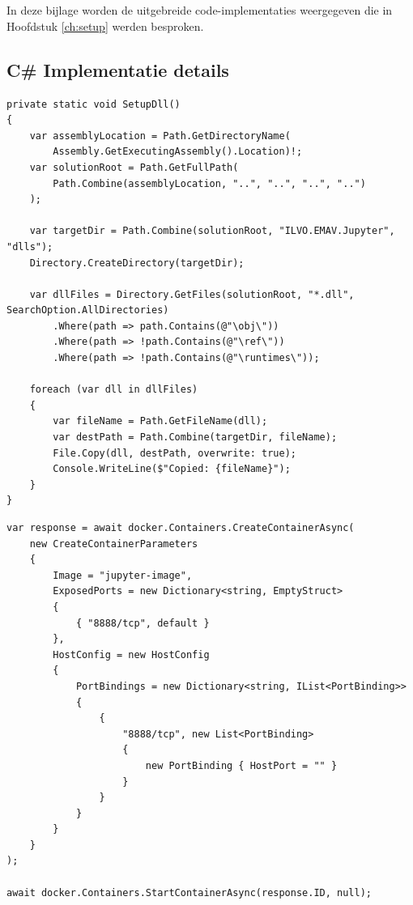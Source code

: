 \chapter{}
\label{ch:codefragmenten}

In deze bijlage worden de uitgebreide code-implementaties weergegeven die in Hoofdstuk \ref{ch:setup} werden besproken.

\section{C\# Implementatie details}
\label{app:csharp_setup}

\begin{listing}[ht]
\begin{verbatim}
private static void SetupDll()
{
    var assemblyLocation = Path.GetDirectoryName(
        Assembly.GetExecutingAssembly().Location)!;
    var solutionRoot = Path.GetFullPath(
        Path.Combine(assemblyLocation, "..", "..", "..", "..")
    );

    var targetDir = Path.Combine(solutionRoot, "ILVO.EMAV.Jupyter", "dlls");
    Directory.CreateDirectory(targetDir);

    var dllFiles = Directory.GetFiles(solutionRoot, "*.dll", SearchOption.AllDirectories)
        .Where(path => path.Contains(@"\obj\"))
        .Where(path => !path.Contains(@"\ref\"))
        .Where(path => !path.Contains(@"\runtimes\"));

    foreach (var dll in dllFiles)
    {
        var fileName = Path.GetFileName(dll);
        var destPath = Path.Combine(targetDir, fileName);
        File.Copy(dll, destPath, overwrite: true);
        Console.WriteLine($"Copied: {fileName}");
    }
}
\end{verbatim}
\caption[Implementatie van de \texttt{SetupDll}-methode.]{Implementatie van de \texttt{SetupDll}-methode voor het verzamelen van DLL-bestanden.}
\label{lst:setupdll}
\end{listing}

\begin{listing}[ht]
\begin{verbatim}
var response = await docker.Containers.CreateContainerAsync(
    new CreateContainerParameters
    {
        Image = "jupyter-image",
        ExposedPorts = new Dictionary<string, EmptyStruct> 
        { 
            { "8888/tcp", default } 
        },
        HostConfig = new HostConfig
        {
            PortBindings = new Dictionary<string, IList<PortBinding>>
            {
                {
                    "8888/tcp", new List<PortBinding>
                    {
                        new PortBinding { HostPort = "" }
                    }
                }
            }
        }
    }
);

await docker.Containers.StartContainerAsync(response.ID, null);
\end{verbatim}
\caption[Aanmaken en opstarten van de Jupyter Docker-container.]{Aanmaken en opstarten van de Jupyter Docker-container via Docker.DotNet.}
\label{lst:docker_create}
\end{listing}


